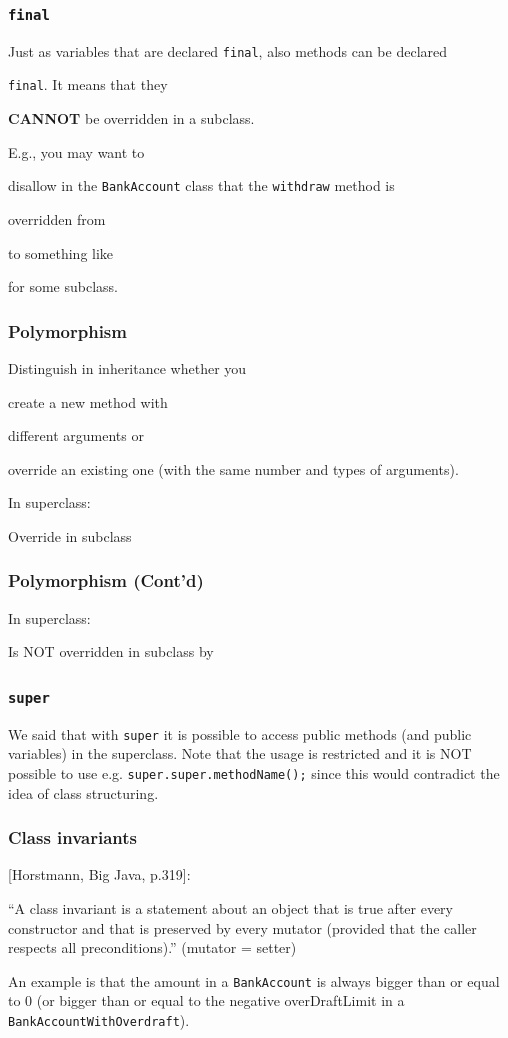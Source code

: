 \documentclass{beamer}
\def\mpause{\pause}
\def\mcolor#1#2{\rule{0ex}{0ex}\color{#1}#2\color{black}{}}
\begin{document}
\begin{frame}
\frametitle{\texttt{final}}

Just as variables that are declared \texttt{final}, also methods can
be declared \mcolor{blue}{\texttt{final}}. It means that they
\mcolor{red}{\textbf{CANNOT}} be overridden in a subclass.\mpause

E.g., you may want to \mcolor{blue}{disallow} in the
\texttt{BankAccount} class that the \texttt{withdraw} method is
\mcolor{blue}{overridden} from

to something like

for some subclass.
\end{frame}

\begin{frame}
\frametitle{Polymorphism}

Distinguish in inheritance whether you \mcolor{blue}{create} a new
method with \mcolor{blue}{different arguments} or
\mcolor{blue}{override an existing one} (with the same number and
types of arguments).

In superclass:


Override in subclass

\end{frame}

\begin{frame}
\frametitle{Polymorphism (Cont'd)}

In superclass:


Is NOT overridden in subclass by

\end{frame}

\begin{frame}
\frametitle{\texttt{super}}

We said that with \texttt{super} it is possible to access public
methods (and public variables) in the superclass. Note that the usage
is restricted and it is NOT possible to use e.g.
\texttt{super.super.methodName();} since this would contradict the
idea of class structuring.
\end{frame}

\begin{frame}
\frametitle{Class invariants}

[Horstmann, Big Java, p.319]:

\mcolor{blue}{``A class invariant is a statement about an object that is true after every constructor and that is preserved by every mutator (provided that the caller respects all preconditions).''} (mutator = setter)

An example is that the amount in a \texttt{BankAccount} is always bigger than or equal to 0 (or bigger than or equal to the negative overDraftLimit in a \texttt{BankAccountWithOverdraft}).

\end{frame}
\end{document}
